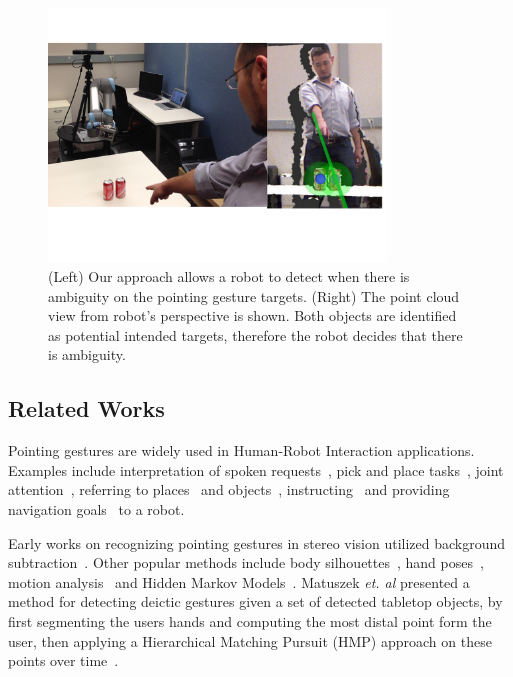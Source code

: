 \documentclass[12pt]{gatech-thesis}
\begin{document}
\begin{figure}[ht!]
\centering
\includegraphics[width=0.8\textwidth]{pics/cover_pointing_gestures}
\caption{(Left) Our approach allows a robot to detect when there is ambiguity on the pointing gesture targets. (Right) The point cloud view from robot's perspective is shown. Both objects are identified as potential intended targets, therefore the robot decides that there is ambiguity.}
\label{fig:cover_pointing_gestures}
\end{figure}



\subsection{Related Works}
\label{sec:pointing_related_works}

Pointing gestures are widely used in Human-Robot Interaction applications. Examples include interpretation of spoken requests~\cite{zukerman2010interpreting}, pick and place tasks~\cite{blodow2011inferring}, joint attention~\cite{droeschel2011towards}, referring to places~\cite{hato2010pointing} and objects~\cite{schmidt2008interacting}, instructing~\cite{martin2010estimation} and providing navigation goals~\cite{raza2013human} to a robot. 

Early works on recognizing pointing gestures in stereo vision utilized background subtraction~\cite{cipolla1996human,jojic2000detection,kahn1995understanding}. Other popular methods include body silhouettes~\cite{kehl2004real}, hand poses~\cite{hu2010hand}, motion analysis~\cite{matikainen2011prop} and Hidden Markov Models~\cite{wilson1999parametric, bennewitz2008robust, li2005hierarchical, nickel2003pointing, droeschel2011learning, aly2012integrated}. Matuszek \emph{et. al} presented a method for detecting deictic gestures given a set of detected tabletop objects, by first segmenting the users hands and computing the most distal point form the user, then applying a Hierarchical Matching Pursuit (HMP) approach on these points over time~\cite{matuszek2014learning}. 
\end{document}
